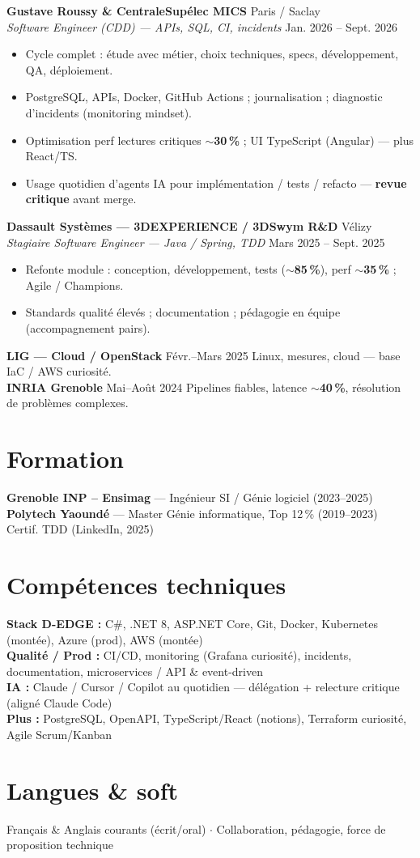 \documentclass[10pt,a4paper]{article}
\begin{document}
\textbf{Gustave Roussy \& CentraleSup\'elec MICS} \hfill Paris / Saclay\\
\textit{Software Engineer (CDD) --- APIs, SQL, CI, incidents} \hfill Jan. 2026 -- Sept. 2026
\begin{itemize}
  \item Cycle complet : \'etude avec m\'etier, choix techniques, specs, d\'eveloppement, QA, d\'eploiement.
  \item PostgreSQL, APIs, Docker, GitHub Actions ; journalisation ; diagnostic d'incidents (monitoring mindset).
  \item Optimisation perf lectures critiques $\sim$\textbf{30\,\%} ; UI TypeScript (Angular) --- plus React/TS.
  \item Usage quotidien d'agents IA pour impl\'ementation / tests / refacto --- \textbf{revue critique} avant merge.
\end{itemize}

\textbf{Dassault Syst\`emes --- 3DEXPERIENCE / 3DSwym R\&D} \hfill V\'elizy\\
\textit{Stagiaire Software Engineer --- Java / Spring, TDD} \hfill Mars 2025 -- Sept. 2025
\begin{itemize}
  \item Refonte module : conception, d\'eveloppement, tests ($\sim$\textbf{85\,\%}), perf $\sim$\textbf{35\,\%} ; Agile / Champions.
  \item Standards qualit\'e \'elev\'es ; documentation ; p\'edagogie en \'equipe (accompagnement pairs).
\end{itemize}

\textbf{LIG --- Cloud / OpenStack} \hfill F\'evr.--Mars 2025 \quad Linux, mesures, cloud --- base IaC / AWS curiosit\'e.\\
\textbf{INRIA Grenoble} \hfill Mai--Ao\^ut 2024 \quad Pipelines fiables, latence $\sim$\textbf{40\,\%}, r\'esolution de probl\`emes complexes.

\section{Formation}
\textbf{Grenoble INP -- Ensimag} --- Ing\'enieur SI / G\'enie logiciel (2023--2025)\\
\textbf{Polytech Yaound\'e} --- Master G\'enie informatique, Top 12\,\% (2019--2023)\\
Certif. TDD (LinkedIn, 2025)

\section{Comp\'etences techniques}
\textbf{Stack D-EDGE :} C\#, .NET 8, ASP.NET Core, Git, Docker, Kubernetes (mont\'ee), Azure (prod), AWS (mont\'ee)\\
\textbf{Qualit\'e / Prod :} CI/CD, monitoring (Grafana curiosit\'e), incidents, documentation, microservices / API \& event-driven\\
\textbf{IA :} Claude / Cursor / Copilot au quotidien --- d\'el\'egation + relecture critique (align\'e Claude Code)\\
\textbf{Plus :} PostgreSQL, OpenAPI, TypeScript/React (notions), Terraform curiosit\'e, Agile Scrum/Kanban

\section{Langues \& soft}
Fran\c{c}ais \& Anglais courants (\'ecrit/oral) $\cdot$ Collaboration, p\'edagogie, force de proposition technique
\end{document}
